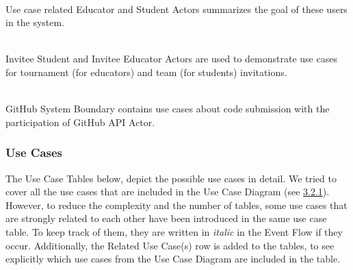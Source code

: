 \\

Use case related Educator and Student Actors summarizes the goal of these users in the system.

\\

Invitee Student and Invitee Educator Actors are used to demonstrate use cases for tournament (for educators) and team (for students) invitations.

\\

GitHub System Boundary contains use cases about code submission with the participation of GitHub API Actor.

\subsubsection{Use Cases}

The Use Case Tables below, depict the possible use cases in detail. We tried to cover all the use cases that are included in the Use Case Diagram (see \hyperref[sec:Use Case Diagram]{3.2.1}). However, to reduce the complexity and the number of tables, some use cases that are strongly related to each other have been introduced in the same use case table. To keep track of them, they are written in \textit{italic} in the Event Flow if they occur. Additionally, the Related Use Case(s) row is added to the tables, to see explicitly which use cases from the Use Case Diagram are included in the table. 


